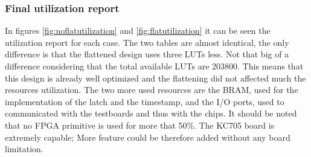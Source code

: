 \subsubsection{Final utilization report}\label{UtilizationReport}
\noindent In figures \ref{fig:noflatutilization} and \ref{fig:flatutilization} it can be seen the utilization report for each case. The two tables are almost identical, the only difference is that the flattened design uses three LUTs less. Not that big of a difference considering that the total available LUTs are 203800.
This means that this design is already well optimized and the flattening did not affected much the resources utilization.
The two more used resources are the BRAM, used for the implementation of the latch and the timestamp, and the I/O ports, used to communicated with the testboards and thus with the chips.
It should be noted that no FPGA primitive is used for more that 50\%. The KC705 board is extremely capable; More feature could be therefore added without any board limitation. 
